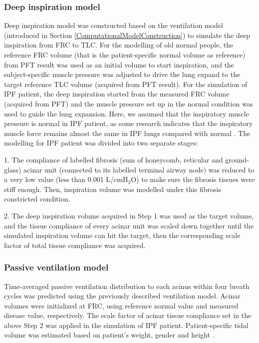 \subsubsection{Deep inspiration model} 
Deep inspiration model was constructed based on the ventilation model (introduced in Section \ref{ComputationalModelConstruction}) to simulate the deep inspiration from FRC to TLC. For the modelling of old normal people, the reference FRC volume (that is the patient-specific normal volume as reference) from PFT result was used as an initial volume to start inspiration, and the subject-specific muscle pressure was adjusted to drive the lung expand to the target reference TLC volume (acquired from PFT result). For the simulation of IPF patient, the deep inspiration started from the measured FRC volume (acquired from PFT) and the muscle pressure set up in the normal condition was used to guide the lung expansion. Here, we assumed that the inspiratory muscle pressure is normal in IPF patient, as some research indicates that the inspiratory muscle force remains almost the same in IPF lungs compared with normal \citep{de1980inspiratory}. The modelling for IPF patient was divided into two separate stages:

1. The compliance of labelled fibrosis (sum of honeycomb, reticular and ground-glass) acinar unit (connected to its labelled terminal airway node) was reduced to a very low value (less than 0.001 $\mathrm{L/cmH_2O}$) to make sure the fibrosis tissues were stiff enough. Then, inspiration volume was modelled under this fibrosis constricted condition.

2. The deep inspiration volume acquired in Step 1 was used as the target volume, and the tissue compliance of every acinar unit was scaled down together until the simulated inspiration volume can hit the target, then the corresponding scale factor of total tissue compliance was acquired.

\subsubsection{Passive ventilation model}
Time-averaged passive ventilation distribution to each acinus within four breath cycles was predicted using the previously described ventilation model. Acinar volumes were initialized at FRC, using reference normal value and measured disease value, respectively. The scale factor of acinar tissue compliance set in the above Step 2 was applied in the simulation of IPF patient. Patient-specific tidal volume was estimated based on patient's weight, gender and height \citep{gilbert1972changes, pelosi1998effects}.

